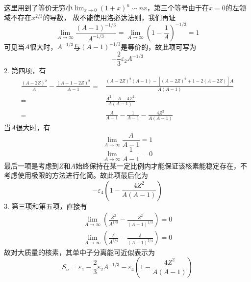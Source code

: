 \begin{exercise*}[C.2]
\begin{equation}
    \end{equation}
    这里用到了等价无穷小$\lim_{x \to 0}(1 + x)^{n} \backsim n x$，第三个等号由于在$x = 0$的左领域不存在$x^{2/3}$的导数，
    故不能使用洛必达法则，我们再证
    \begin{equation*}
        \lim_{A \to \infty} \frac{(A - 1)^{-1/3}}{A^{-1/3}} = \lim_{A \to \infty}\left(1 - \frac{1}{A}\right)^{-1/3}
        = 1
    \end{equation*}
    可见当$A$很大时，$A^{-1/3}$与$(A - 1)^{-1/3}$是等价的，故此项可写为
    $$-\frac{2}{3}\varepsilon_2 A^{-1/3}$$
    2. 第四项，有
    \begin{equation*}
        \begin{aligned}
            \frac{(A - 2Z)^2}{A} - \frac{(A - 1 - 2Z)^2}{A - 1}
            =& \frac{(A - 2Z)^2(A - 1) - [(A - 2Z)^2 + 1 - 2(A - 2Z)]A}{A(A - 1)} \\
            =& \frac{A^2 - A - 4Z^2}{A(A - 1)} \\
            =& \frac{A}{A - 1} - \frac{1}{A - 1} - \frac{4Z^2}{A(A - 1)}
        \end{aligned}
    \end{equation*}
    当$A$很大时，有
    $$\lim_{A \to \infty} \frac{A}{A - 1} = 1$$
    $$\lim_{A \to \infty} \frac{1}{A - 1} = 0$$
    最后一项是考虑到$Z$和$A$始终保持在某一定比例内才能保证该核素能稳定存在，不考虑使用极限的方法进行化简。故此项最后化为
    $$-\varepsilon_4(1 - \frac{4Z^2}{A(A - 1)})$$
    3. 第三项和第五项，直接有
    \begin{equation}
        \begin{aligned}
            \lim_{A \to \infty} \left(\frac{Z^2}{A^{1/3}} - \frac{Z^2}{(A - 1)^{1/3}}\right) = 0 \\
            \lim_{A \to \infty} \left(\frac{\delta}{A^{3/4}} - \frac{\delta}{(A - 1)^{3/4}}\right) = 0
        \end{aligned}
    \end{equation}
    故对大质量的核素，其单中子分离能可近似表示为
    $$S_n = \varepsilon_1 - \frac{2}{3}\varepsilon_2 A^{-1/3} - \varepsilon_4(1 - \frac{4Z^2}{A(A - 1)})$$
\end{exercise*}


